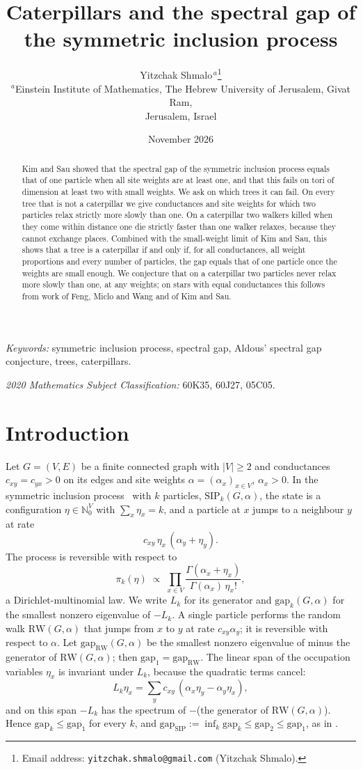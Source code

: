 \documentclass[11pt]{article}
\title{Caterpillars and the spectral gap of the symmetric inclusion process}
\author{Yitzchak Shmalo$^{\,a}$\thanks{Email address:
\texttt{yitzchak.shmalo@gmail.com} (Yitzchak Shmalo).}\\
{\small $^{a}$Einstein Institute of Mathematics, The Hebrew University of
Jerusalem, Givat Ram,}\\
{\small Jerusalem, Israel}}
\date{November 2026}
\theoremstyle{remark}
\newcommand{\gap}{\mathrm{gap}}
\newcommand{\RW}{\mathrm{RW}}
\begin{document}
\maketitle

\begin{abstract}
Kim and Sau showed that the spectral gap of the symmetric inclusion process equals that of one particle when all site weights are at least one, and that this fails on tori of dimension at least two with small weights. We ask on which trees it can fail. On every tree that is not a caterpillar we give conductances and site weights for which two particles relax strictly more slowly than one. On a caterpillar two walkers killed when they come within distance one die strictly faster than one walker relaxes, because they cannot exchange places. Combined with the small-weight limit of Kim and Sau, this shows that a tree is a caterpillar if and only if, for all conductances, all weight proportions and every number of particles, the gap equals that of one particle once the weights are small enough. We conjecture that on a caterpillar two particles never relax more slowly than one, at any weights; on stars with equal conductances this follows from work of Feng, Miclo and Wang and of Kim and Sau.
\end{abstract}

\noindent\textit{Keywords:} symmetric inclusion process, spectral gap, Aldous' spectral gap conjecture, trees, caterpillars.

\noindent\textit{2020 Mathematics Subject Classification:} 60K35, 60J27, 05C05.

\section{Introduction}

Let $G=(V,E)$ be a finite connected graph with $|V|\ge2$ and conductances $c_{xy}=c_{yx}>0$ on its edges and site weights $\alpha=(\alpha_x)_{x\in V}$, $\alpha_x>0$. In the symmetric inclusion process~\cite{GKR07} with $k$ particles, $\mathrm{SIP}_k(G,\alpha)$, the state is a configuration $\eta\in\mathbb{N}_0^V$ with $\sum_x\eta_x=k$, and a particle at $x$ jumps to a neighbour $y$ at rate
\[
c_{xy}\,\eta_x\,(\alpha_y+\eta_y).
\]
The process is reversible with respect to
\[
\pi_k(\eta)\;\propto\;\prod_{x\in V}\frac{\Gamma(\alpha_x+\eta_x)}{\Gamma(\alpha_x)\,\eta_x!},
\]
a Dirichlet-multinomial law. We write $L_k$ for its generator and $\gap_k(G,\alpha)$ for the smallest nonzero eigenvalue of $-L_k$. A single particle performs the random walk $\RW(G,\alpha)$ that jumps from $x$ to $y$ at rate $c_{xy}\alpha_y$; it is reversible with respect to $\alpha$. Let $\gap_{\RW}(G,\alpha)$ be the smallest nonzero eigenvalue of minus the generator of $\RW(G,\alpha)$; then $\gap_1=\gap_{\RW}$. The linear span of the occupation variables $\eta_x$ is invariant under $L_k$, because the quadratic terms cancel:
\[
L_k\eta_x=\sum_{y}c_{xy}\,(\alpha_x\eta_y-\alpha_y\eta_x),
\]
and on this span $-L_k$ has the spectrum of $-$(the generator of $\RW(G,\alpha)$). Hence $\gap_k\le\gap_1$ for every $k$, and $\gap_{\mathrm{SIP}}:=\inf_k\gap_k\le\gap_2\le\gap_1$, as in \cite{KS24}.
\end{document}
